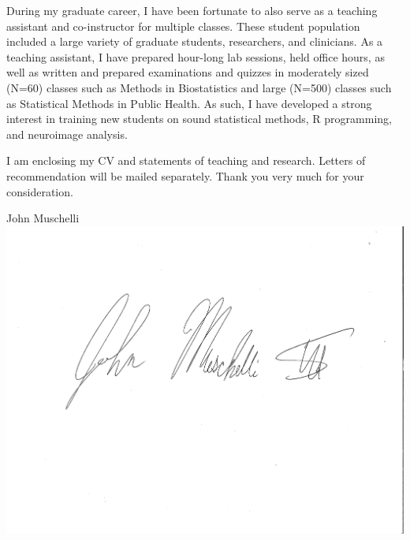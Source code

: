 \documentclass[12pt,a4paper]{article}
\begin{document}
During my graduate career, I have been fortunate to also serve as a teaching assistant and co-instructor for multiple classes.  These student population included a large variety of graduate students, researchers, and clinicians.  As a teaching assistant, I have prepared hour-long lab sessions, held office hours, as well as written and prepared examinations and quizzes in moderately sized (N=60) classes such as Methods in Biostatistics and large (N=500) classes such as Statistical Methods in Public Health.  As such, I have developed a strong interest in training new students on sound statistical methods, R programming, and neuroimage analysis.

\specificending

\vspace{3em}
I am enclosing my CV and statements of teaching and research. Letters of recommendation will be mailed separately. Thank you very much for your consideration. 

\vspace{1em}

John Muschelli\\
\includegraphics[scale=0.3]{Signature.pdf}
\end{document}
